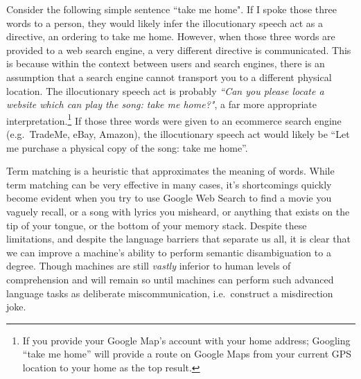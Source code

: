 Consider the following simple sentence ``take me home". If I spoke those three words to a person, they would likely infer the illocutionary speech act as a directive, an ordering to take me home. However, when those three words are provided to a web search engine, a very different directive is communicated. This is because within the context between users and search engines, there is an assumption that a search engine cannot transport you to a different physical location. The illocutionary speech act is probably \textit{``Can you please locate a website which can play the song: take me home?"}, a far more appropriate interpretation.\footnote{If you provide your Google Map's account with your home address; Googling ``take me home'' will provide a route on Google Maps from your current GPS location to your home as the top result.} If those three words were given to an ecommerce search engine (e.g.\ TradeMe, eBay, Amazon), the illocutionary speech act would likely be ``Let me purchase a physical copy of the song: take me home''.

Term matching is a heuristic that approximates the meaning of words. While term matching can be very effective in many cases, it's shortcomings quickly become evident when you try to use Google Web Search to find a movie you vaguely recall, or a song with lyrics you misheard, or anything that exists on the tip of your tongue, or the bottom of your memory stack. Despite these limitations, and despite the language barriers that separate us all, it is clear that we can improve a machine's ability to perform semantic disambiguation to a degree. Though machines are still \textit{vastly} inferior to human levels of comprehension and will remain so until machines can perform such advanced language tasks as deliberate miscommunication, i.e.\ construct a misdirection joke.









